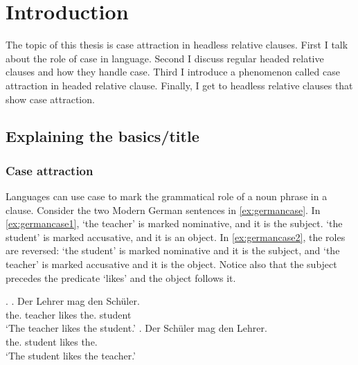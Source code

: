 
\chapter{Introduction}

The topic of this thesis is case attraction in headless relative clauses. First I talk about the role of case in language. Second I discuss regular headed relative clauses and how they handle case. Third I introduce a phenomenon called case attraction in headed relative clause. Finally, I get to headless relative clauses that show case attraction.


\section{Explaining the basics/title}


\subsection{Case attraction}

Languages can use case to mark the grammatical role of a noun phrase in a clause. Consider the two Modern German sentences in \ref{ex:germancase}. In \ref{ex:germancase1},  `the teacher' is marked nominative, and it is the subject.  `the student' is marked accusative, and it is an object. In \ref{ex:germancase2}, the roles are reversed:  `the student' is marked nominative and it is the subject, and  `the teacher' is marked accusative and it is the object. Notice also that the subject precedes the predicate  `likes' and the object follows it.

\ex.\label{ex:germancase}
\ag. Der Lehrer mag den Schüler.\\
 the. teacher likes the. student\\
 `The teacher likes the student.'\label{ex:germancase1}
\bg. Der Schüler mag den Lehrer.\\
 the. student likes the.\\
 `The student likes the teacher.'\label{ex:germancase2}

